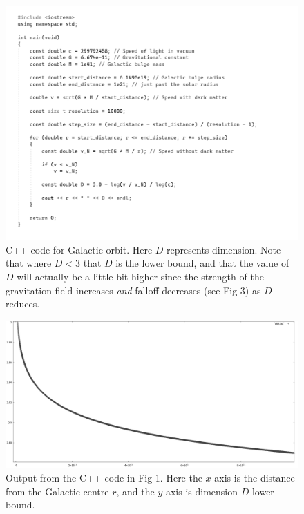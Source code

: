 \documentclass[12pt]{article}
\begin{document}
\pagebreak


\begin{figure} 
\centering
  \includegraphics[width = 6 in]{code.png}
  \caption{ C++ code for Galactic orbit. 
Here $D$ represents dimension.
Note that where $D < 3$ that $D$ is the lower bound, and that the value of $D$ will actually be a little bit higher since the strength of the gravitation field increases {\textit{and}} falloff decreases (see Fig 3) as $D$ reduces.
}
\end{figure}


\begin{figure} 
\centering
  \includegraphics[width = 5 in]{dimension_graph.png}
  \caption{ Output from the C++ code in Fig 1.
Here the $x$ axis is the distance from the Galactic centre $r$, and the $y$ axis is dimension $D$ lower bound.}
\end{figure}
\end{document}
